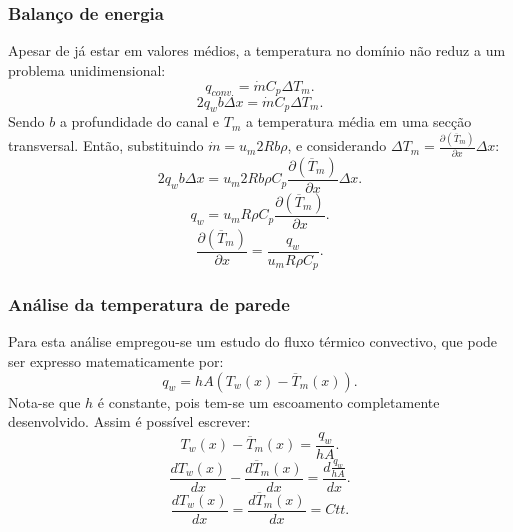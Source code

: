 \documentclass[xcolor=dvipsnames,10pt,aspectratio=169]{beamer}
\begin{document}
		
	
	
	
		\begin{frame}
		\frametitle{Balanço de energia}
		Apesar de já estar em valores médios, a temperatura no domínio não reduz a um problema unidimensional:
		\begin{equation}\label{c_h_e}
		q_{conv.} = \dot{m} C_p \Delta T_m.
		\end{equation}
		\begin{equation}
		2q_w b \Delta x = \dot{m} C_p \Delta T_m.
		\end{equation}
		Sendo $b$ a profundidade do canal e $T_m$ a temperatura média em uma secção transversal. Então, substituindo $ \dot{m} = u_m 2R b \rho $, e considerando $ \Delta T_m = \frac{\partial{\left(\overline{T}_m\right)}}{\partial{x}} \Delta x $:
		\begin{equation}
		2q_w b \Delta x = u_m 2R b \rho  C_p \frac{\partial{\left(\overline{T}_m\right)}}{\partial{x}} \Delta x.
		\end{equation}     
		\begin{equation}
		q_w = u_m R \rho  C_p \frac{\partial{\left(\overline{T}_m\right)}}{\partial{x}} .
		\end{equation} 
		\begin{equation}\label{c_h_ee}
		\frac{\partial{\left(\overline{T}_m\right)}}{\partial{x}} = \frac{q_w}{u_m  R \rho  C_p } .
		\end{equation} 
		\end{frame}
	
	
	
	
		\begin{frame}
		\frametitle{Análise da temperatura de parede}
		Para esta análise empregou-se um estudo do fluxo térmico convectivo, que pode ser expresso matematicamente por:
		\begin{equation}
		q_w = h A \left( T_w(x) - \overline{T}_m(x)\right).
		\end{equation}
		Nota-se que $h$ é constante, pois tem-se um escoamento completamente desenvolvido. Assim é possível escrever:
		\begin{equation}
		 T_w(x) - \overline{T}_m(x) = \frac{q_w}{hA}.
		\end{equation}
		\begin{equation}
		\frac{d T_w(x)}{d x} - \frac{d \overline{T}_m(x)}{d x} = \frac{d \frac{q_w}{hA}}{dx}.
		\end{equation}
		\begin{equation}
		\frac{d T_w(x)}{d x} = \frac{d \overline{T}_m(x)}{d x} = Ctt.
		\end{equation}	
		\end{frame}
	
\end{document}
